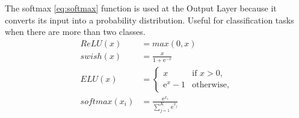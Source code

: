 \documentclass[../main.tex]{subfile}
\begin{document}
The softmax \eqref{eq:softmax} function is used at the Output Layer because it converts its input into a probability distribution. Useful for classification tasks when there are more than two classes.
\begin{align}
    ReLU(x)        & = max(0, x) \label{eq:relu}                                                       \\
    swish(x)       & = \frac{x}{1 + \mathrm{e}^{-x}} \label{eq:swish}                                  \\
    ELU(x)         & =
    \begin{cases}
        x                  & \mbox{if } x > 0, \\
        \mathrm{e}^{x} - 1 & \mbox{otherwise},
    \end{cases} \label{eq:elu}                                                           \\
    softmax(x_{i}) & = \frac{\mathrm{e}^{x_{i}}}{\sum^{K}_{j=1} \mathrm{e}^{x_{j}}} \label{eq:softmax}
\end{align}
\end{document}
